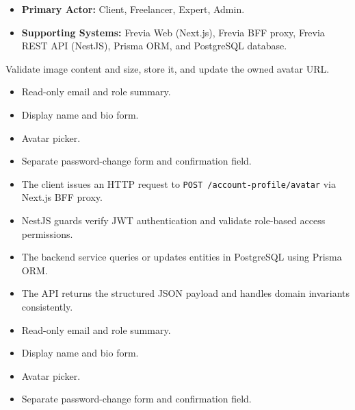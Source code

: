 
\begin{itemize}[leftmargin=1.6em,topsep=3pt,itemsep=2pt,parsep=0pt,label=$\bullet$]
    \item \textbf{Primary Actor:} Client, Freelancer, Expert, Admin.
    \item \textbf{Supporting Systems:} Frevia Web (Next.js), Frevia BFF proxy, Frevia REST API (NestJS), Prisma ORM, and PostgreSQL database.
\end{itemize}

\noindent Validate image content and size, store it, and update the owned avatar URL.

\begin{itemize}[leftmargin=1.6em,topsep=3pt,itemsep=2pt,parsep=0pt,label=$\bullet$]
    \item Read-only email and role summary.
    \item Display name and bio form.
    \item Avatar picker.
    \item Separate password-change form and confirmation field.
\end{itemize}

\begin{itemize}[leftmargin=1.6em,topsep=3pt,itemsep=2pt,parsep=0pt,label=$\bullet$]
    \item The client issues an HTTP request to \texttt{POST /\allowbreak{}account-\allowbreak{}profile/\allowbreak{}avatar} via Next.js BFF proxy.
    \item NestJS guards verify JWT authentication and validate role-based access permissions.
    \item The backend service queries or updates entities in PostgreSQL using Prisma ORM.
    \item The API returns the structured JSON payload and handles domain invariants consistently.
\end{itemize}

\begin{itemize}[leftmargin=1.6em,topsep=3pt,itemsep=2pt,parsep=0pt,label=$\bullet$]
    \item Read-only email and role summary.
    \item Display name and bio form.
    \item Avatar picker.
    \item Separate password-change form and confirmation field.
\end{itemize}

